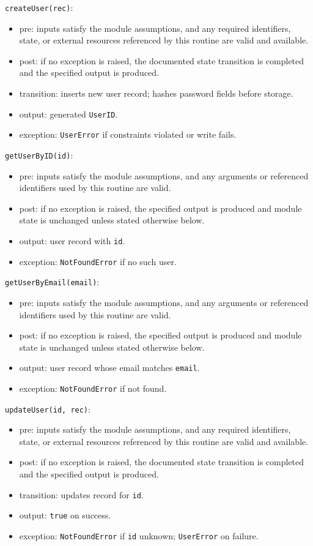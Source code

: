 \documentclass[12pt, titlepage]{article}
\begin{document}
\noindent \texttt{createUser(rec)}:
\begin{itemize}
    \item pre: inputs satisfy the module assumptions, and any required identifiers, state, or external resources referenced by this routine are valid and available.
    \item post: if no exception is raised, the documented state transition is completed and the specified output is produced.
    \item transition: inserts new user record; hashes password fields before storage.
    \item output: generated \texttt{UserID}.
    \item exception: \texttt{UserError} if constraints violated or write fails.
\end{itemize}

\noindent \texttt{getUserByID(id)}:
\begin{itemize}
    \item pre: inputs satisfy the module assumptions, and any arguments or referenced identifiers used by this routine are valid.
    \item post: if no exception is raised, the specified output is produced and module state is unchanged unless stated otherwise below.
    \item output: user record with \texttt{id}.
    \item exception: \texttt{NotFoundError} if no such user.
\end{itemize}

\noindent \texttt{getUserByEmail(email)}:
\begin{itemize}
    \item pre: inputs satisfy the module assumptions, and any arguments or referenced identifiers used by this routine are valid.
    \item post: if no exception is raised, the specified output is produced and module state is unchanged unless stated otherwise below.
    \item output: user record whose email matches \texttt{email}.
    \item exception: \texttt{NotFoundError} if not found.
\end{itemize}

\noindent \texttt{updateUser(id, rec)}:
\begin{itemize}
    \item pre: inputs satisfy the module assumptions, and any required identifiers, state, or external resources referenced by this routine are valid and available.
    \item post: if no exception is raised, the documented state transition is completed and the specified output is produced.
    \item transition: updates record for \texttt{id}.
    \item output: \texttt{true} on success.
    \item exception: \texttt{NotFoundError} if \texttt{id} unknown; \texttt{UserError} on failure.
\end{itemize}
\end{document}
